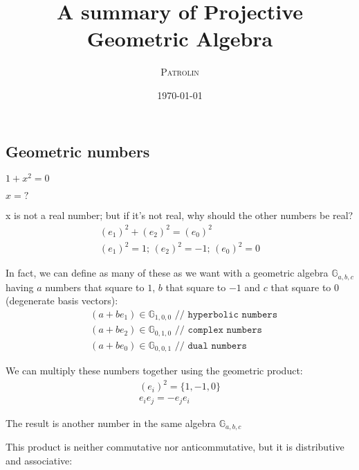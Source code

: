 \documentclass[twoside]{article}
\title{A summary of Projective Geometric Algebra}
\author{\textsc{Patrolin}}
\date{\today}
\newcommand{\T}[1]{\textrm{#1}} %
\newcommand{\B}[1]{\left(#1\right)} %
\newcommand{\aside}[1]{\begin{flushright}\scriptsize{#1}\end{flushright}}
\begin{document}
    \maketitle
    \thispagestyle{empty}

    \begin{multicols*}{2}
        \section{Geometric numbers}
            \centerline{$ 1 + x^2 = 0 $}
            \centerline{$ x = \T{?} $}\vspace{5px}
            \par
                x is not a real number; but if it's not real, why should the other numbers be real?
                \begin{gather*}
                    \B{e_1}^2 + \B{e_2}^2 = \B{e_0}^2 \\
                    \B{e_1}^2 = 1;\, \B{e_2}^2 = -1;\, \B{e_0}^2 = 0
                \end{gather*}
            \par
                In fact, we can define as many of these as we want with a geometric algebra $ \mathbb{G}_{a,b,c} $
                having $ a $ numbers that square to $ 1 $, $ b $ that square to $ -1 $
                and $ c $ that square to $ 0 $ (degenerate basis vectors):
                $$\begin{aligned}
                    &(a + b e_1) \in \mathbb{G}_{1,0,0} \texttt{ // hyperbolic numbers} \\
                    &(a + b e_2) \in \mathbb{G}_{0,1,0} \texttt{ // complex numbers} \\
                    &(a + b e_0) \in \mathbb{G}_{0,0,1} \texttt{ // dual numbers}
                \end{aligned}$$
            \par
                We can multiply these numbers together using the geometric product:
                \begin{gather*}
                    \B{e_i}^2 = \{1, -1, 0\} \\
                    e_i e_j = -e_j e_i
                \end{gather*}
                \aside{The result is another number in the same algebra $ \mathbb{G}_{a,b,c} $}
            \par
                This product is neither commutative nor anticommutative, but it is distributive and associative:
                $$\begin{aligned}

\end{aligned}$$
\end{multicols*}
\end{document}

